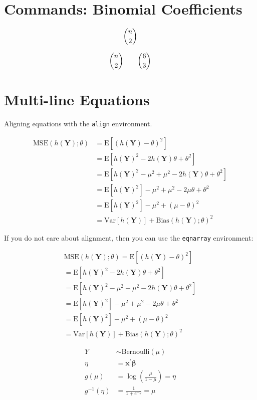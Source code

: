\documentclass[11pt,oneside, letterpaper]{article}
\newcommand{\bbeta}{\boldsymbol{\beta}}
\newcommand{\bY}{\textbf{Y}}
\newcommand{\bx}{\textbf{x}}
\newcommand{\MSE}{\text{MSE}}
\newcommand{\Var}{\text{Var}}
\newcommand{\Exp}{\text{E}}
\begin{document}
\section{Commands: Binomial Coefficients}

$$
\bincoef{n}{2}
$$

$$
\binco{2} \qquad \binco[6]{3}
$$

\section{Multi-line Equations}

Aligning equations with the \texttt{align} environment.

\begin{align*}
        \MSE (h(\bY);\theta) &= \text{E} \left [ \left( h(\bY) - \theta \right)^2\right] \\
        &= \Exp \left [h(\bY)^2 - 2 h(\bY) \theta + \theta^2\right ]\\
        &= \Exp \left [h(\bY)^2 - \mu^2 + \mu^2 - 2 h(\bY) \theta + \theta^2\right ]\\
        &= \Exp \left [h(\bY)^2 \right ] - \mu^2  + \mu^2 - 2 \mu \theta + \theta^2 \\
        &= \Exp \left [h(\bY)^2 \right ] - \mu^2  + (\mu - \theta)^2 \\
        &= \Var[h(\bY)] + \text{Bias}(h(\bY);\theta)^2
\end{align*}


If you do not care about alignment, then you can use the \verb|eqnarray| environment:

\begin{eqnarray*}
        \MSE (h(\bY);\theta) = \text{E} \left [ \left( h(\bY) - \theta \right)^2\right] \\
        = \Exp \left [h(\bY)^2 - 2 h(\bY) \theta + \theta^2\right ]\\
        = \Exp \left [h(\bY)^2 - \mu^2 + \mu^2 - 2 h(\bY) \theta + \theta^2\right ]\\
        = \Exp \left [h(\bY)^2 \right ] - \mu^2  + \mu^2 - 2 \mu \theta + \theta^2 \\
        = \Exp \left [h(\bY)^2 \right ] - \mu^2  + (\mu - \theta)^2 \\
        = \Var[h(\bY)] + \text{Bias}(h(\bY);\theta)^2
\end{eqnarray*}


\begin{align*}
Y &\sim \text{Bernoulli}(\mu) \\
\eta         &= \bx^\prime\bbeta \\
g(\mu)       &= \log \left(\frac{\mu}{1-\mu} \right) = \eta \\
g^{-1}(\eta) &= \frac{1}{1+e^{-\eta}} = \mu
\end{align*}
\end{document}
